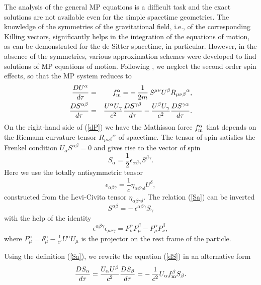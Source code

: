 \documentclass[preprint,showpacs,preprintnumbers,eqsecnum,amsmath,amssymb]{revtex4-1}
\begin{document}
The analysis of the general MP equations is a difficult task \cite{plyatsko}
and the exact solutions are not available even for the simple spacetime
geometries. The knowledge of the symmetries of the gravitational field,
i.e., of the corresponding Killing vectors, significantly helps in the
integration of the equations of motion, as can be demonstrated \cite{OP}
for the de Sitter spacetime, in particular. However, in the absence of
the symmetries, various approximation schemes were developed to find
solutions of MP equations of motion. Following \cite{chicone}, we
neglect the second order spin effects, so that the MP system reduces to
\begin{eqnarray}\label{dP}
{\frac {DU^\alpha}{d\tau}} &=& f_{\rm m}^\alpha = -\,{\frac 1{2m}}
\,S^{\mu\nu}U^\beta R_{\mu\nu\beta}{}^\alpha,\\
{\frac {DS^{\alpha\beta}}{d\tau}} &=& {\frac {U^\alpha U_\gamma}{c^2}}
{\frac {DS^{\gamma\beta}}{d\tau}} -  {\frac {U^\beta U_\gamma}{c^2}}
{\frac {DS^{\gamma\alpha}}{d\tau}}.\label{dS}
\end{eqnarray}
On the right-hand side of (\ref{dP}) we have the Mathisson force
$f_{\rm m}^\alpha$ that depends on the Riemann curvature tensor
$R_{\mu\nu\beta}{}^\alpha$ of spacetime. The tensor of spin satisfies
the Frenkel condition $U_\alpha S^{\alpha\beta} = 0$ and gives rise
to the vector of spin
\begin{equation}\label{Sa}
S_\alpha = {\frac 12}\epsilon_{\alpha\beta\gamma}S^{\beta\gamma}.
\end{equation}
Here we use the totally antisymmetric tensor
\begin{equation}\label{epsabc}
\epsilon_{\alpha\beta\gamma} = {\frac 1c}\eta_{\alpha\beta\gamma\delta}U^\delta,
\end{equation}
constructed from the Levi-Civita tensor $\eta_{\alpha\beta\gamma\delta}$.
The relation (\ref{Sa}) can be inverted
\begin{equation}\label{Sab}
S^{\alpha\beta} = - \,\epsilon^{\alpha\beta\gamma}S_{\gamma}
\end{equation}
with the help of the identity
\begin{equation}
\epsilon^{\alpha\beta\gamma}\epsilon_{\mu\nu\gamma} = P^\alpha_\nu P^\beta_\mu
- P^\alpha_\mu P^\beta_\nu,\label{eePP}
\end{equation}
where $P^\alpha_\mu = \delta^\alpha_\mu - {\frac 1{c^2}}U^\alpha U_\mu$
is the projector on the rest frame of the particle.

Using the definition (\ref{Sa}), we rewrite the equation (\ref{dS})
in an alternative form
\begin{equation}\label{dSa}
{\frac {DS_{\alpha}}{d\tau}} = {\frac {U_\alpha U^\beta}{c^2}}
{\frac {DS_\beta}{d\tau}} = -\,{\frac 1{c^2}}U_\alpha f_{\rm m}^\beta S_\beta.
\end{equation}
\end{document}
